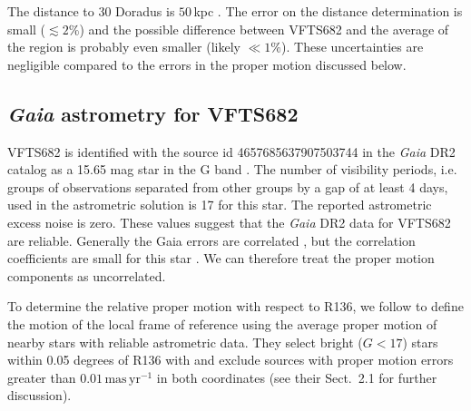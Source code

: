 \documentclass[apjl,twocolumn]{emulateapj}
\newcommand{\SdM}[1]{{{\color{brown}{#1}}}}
\newcommand{\Msun}{{\,\mathrm{M}_\odot}}
\newcommand{\masyr}{\,\mathrm{mas}\,\mathrm{yr}^{-1}}
\begin{document}



The distance to 30 Doradus is $50$\,kpc  \citep[][]{pietrzynski:13}. The error on the distance determination is small ($\lesssim2\%$) and the possible difference between VFTS682 and the average of the region is probably even smaller (likely $\ll 1\%$). These uncertainties are negligible compared to the errors in the proper motion discussed below.  




\subsection{ \emph{Gaia} astrometry for VFTS682\label{data:gaia}}



VFTS682 is identified with the source id 4657685637907503744 in the
\emph{Gaia} DR2 catalog  as a 15.65 mag star in the G band
\citep{gaia:16,brown:18}.   The number of visibility periods,
i.e. groups of observations separated from other groups by a gap of at
least 4 days, used in the astrometric solution is 17 for this
star. The reported astrometric excess noise is zero.  These values
suggest that the \emph{Gaia} DR2  data for VFTS682 are
reliable. Generally the Gaia errors are correlated  \citep[][]{lindengren:18}, but the correlation coefficients are small for this star%
. We can therefore treat the proper motion components as uncorrelated.

To determine the relative proper motion with respect to R136, we follow  \citet{lennon:18} to define the motion of the local frame of reference using the average proper motion of nearby stars with reliable astrometric data.  They select  bright ($G<17$) stars within 0.05 degrees of R136 with and exclude sources with proper motion errors greater than $0.01\masyr$ in both coordinates (see their  Sect.~2.1 for further discussion).  
\end{document}
